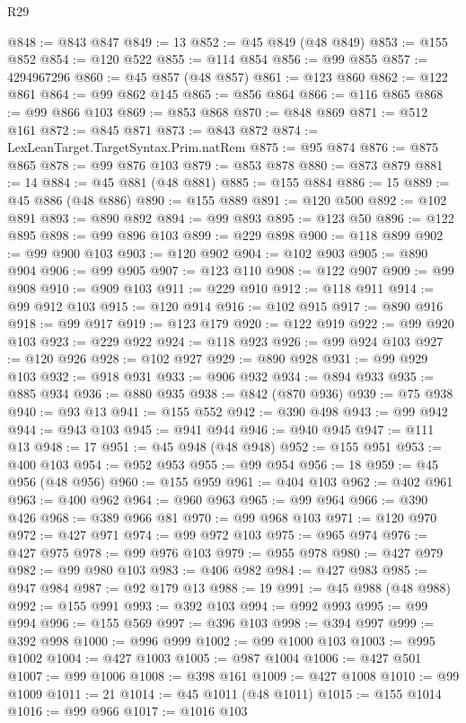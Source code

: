 \begin{lexlean}{R29}
\begin{coremodule}
@848 := @843 @847
@849 := 13
@852 := @45 @849 (@48 @849)
@853 := @155 @852
@854 := @120 @522
@855 := @114 @854
@856 := @99 @855
@857 := 4294967296
@860 := @45 @857 (@48 @857)
@861 := @123 @860
@862 := @122 @861
@864 := @99 @862 @145
@865 := @856 @864
@866 := @116 @865
@868 := @99 @866 @103
@869 := @853 @868
@870 := @848 @869
@871 := @512 @161
@872 := @845 @871
@873 := @843 @872
@874 := LexLeanTarget.TargetSyntax.Prim.natRem
@875 := @95 @874
@876 := @875 @865
@878 := @99 @876 @103
@879 := @853 @878
@880 := @873 @879
@881 := 14
@884 := @45 @881 (@48 @881)
@885 := @155 @884
@886 := 15
@889 := @45 @886 (@48 @886)
@890 := @155 @889
@891 := @120 @500
@892 := @102 @891
@893 := @890 @892
@894 := @99 @893
@895 := @123 @50
@896 := @122 @895
@898 := @99 @896 @103
@899 := @229 @898
@900 := @118 @899
@902 := @99 @900 @103
@903 := @120 @902
@904 := @102 @903
@905 := @890 @904
@906 := @99 @905
@907 := @123 @110
@908 := @122 @907
@909 := @99 @908
@910 := @909 @103
@911 := @229 @910
@912 := @118 @911
@914 := @99 @912 @103
@915 := @120 @914
@916 := @102 @915
@917 := @890 @916
@918 := @99 @917
@919 := @123 @179
@920 := @122 @919
@922 := @99 @920 @103
@923 := @229 @922
@924 := @118 @923
@926 := @99 @924 @103
@927 := @120 @926
@928 := @102 @927
@929 := @890 @928
@931 := @99 @929 @103
@932 := @918 @931
@933 := @906 @932
@934 := @894 @933
@935 := @885 @934
@936 := @880 @935
@938 := @842 (@870 @936)
@939 := @75 @938
@940 := @93 @13
@941 := @155 @552
@942 := @390 @498
@943 := @99 @942
@944 := @943 @103
@945 := @941 @944
@946 := @940 @945
@947 := @111 @13
@948 := 17
@951 := @45 @948 (@48 @948)
@952 := @155 @951
@953 := @400 @103
@954 := @952 @953
@955 := @99 @954
@956 := 18
@959 := @45 @956 (@48 @956)
@960 := @155 @959
@961 := @404 @103
@962 := @402 @961
@963 := @400 @962
@964 := @960 @963
@965 := @99 @964
@966 := @390 @426
@968 := @389 @966 @81
@970 := @99 @968 @103
@971 := @120 @970
@972 := @427 @971
@974 := @99 @972 @103
@975 := @965 @974
@976 := @427 @975
@978 := @99 @976 @103
@979 := @955 @978
@980 := @427 @979
@982 := @99 @980 @103
@983 := @406 @982
@984 := @427 @983
@985 := @947 @984
@987 := @92 @179 @13
@988 := 19
@991 := @45 @988 (@48 @988)
@992 := @155 @991
@993 := @392 @103
@994 := @992 @993
@995 := @99 @994
@996 := @155 @569
@997 := @396 @103
@998 := @394 @997
@999 := @392 @998
@1000 := @996 @999
@1002 := @99 @1000 @103
@1003 := @995 @1002
@1004 := @427 @1003
@1005 := @987 @1004
@1006 := @427 @501
@1007 := @99 @1006
@1008 := @398 @161
@1009 := @427 @1008
@1010 := @99 @1009
@1011 := 21
@1014 := @45 @1011 (@48 @1011)
@1015 := @155 @1014
@1016 := @99 @966
@1017 := @1016 @103

\end{coremodule}
\end{lexlean}
